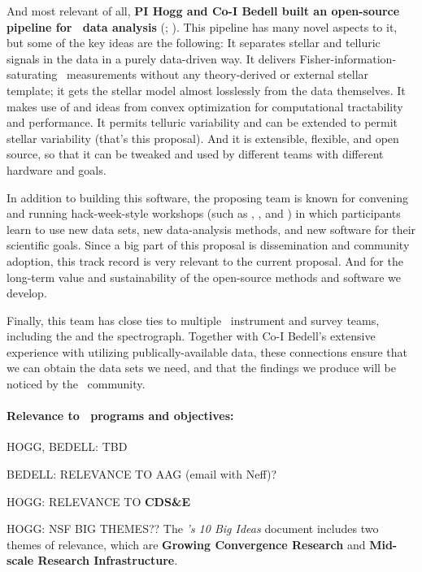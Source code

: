 \documentclass[12pt, letterpaper]{article}
\begin{document}
And most relevant of all, \textbf{PI Hogg and Co-I Bedell built an open-source
pipeline for \EPRV\ data analysis} (\wobble; \citealt{Bedell2019}).
This pipeline has many novel aspects to it, but some of the key ideas
are the following: 
It separates stellar and telluric signals in the data in a purely
data-driven way.
It delivers Fisher-information-saturating \RV\ measurements without any
theory-derived or external stellar template; it gets the stellar model
almost losslessly from the data themselves.
It makes use of  and ideas from convex optimization
for computational tractability and performance.
It permits telluric variability and can be extended to permit stellar
variability (that's this proposal).
And it is extensible, flexible, and open source, so that it can be
tweaked and used by different teams with different hardware and goals.

In addition to building this software, the proposing team is known for
convening and running hack-week-style workshops (such as , , and ) in which participants learn to use new data sets, new
data-analysis methods, and new software for their scientific goals.
Since a big part of this proposal is dissemination and community adoption,
this track record is very relevant to the current proposal.
And for the long-term value and sustainability of the open-source methods
and software we develop.

Finally, this team has close ties to multiple \EPRV\ instrument and survey
teams, including the  and the 
spectrograph. Together with Co-I Bedell's extensive experience with utilizing 
publically-available  data, these connections ensure that 
we can obtain the data sets we need, and that the findings we produce will 
be noticed by the \EPRV\ community.

\paragraph{Relevance to \NSF\ programs and objectives:}

HOGG, BEDELL: TBD

BEDELL: RELEVANCE TO AAG (email with Neff)?

HOGG: RELEVANCE TO \textbf{CDS\&E}

HOGG: NSF BIG THEMES?? The \textit{\NSF's 10 Big Ideas} document
includes two themes of relevance, which are \textbf{Growing
  Convergence Research} and \textbf{Mid-scale Research
  Infrastructure}.
\end{document}

